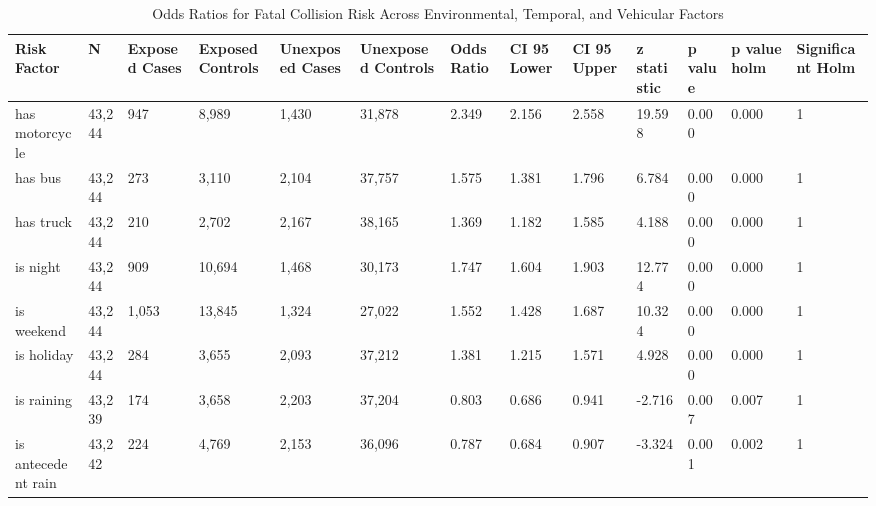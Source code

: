 \begin{table}[htbp]
\centering
\caption{Odds Ratios for Fatal Collision Risk Across Environmental, Temporal, and Vehicular Factors}
\label{tab:odds_ratios}
\begin{tabular}{lllllllllllll}
\toprule
\textbf{Risk Factor} & \textbf{N} & \textbf{Exposed Cases} & \textbf{Exposed Controls} & \textbf{Unexposed Cases} & \textbf{Unexposed Controls} & \textbf{Odds Ratio} & \textbf{CI 95 Lower} & \textbf{CI 95 Upper} & \textbf{z statistic} & \textbf{p value} & \textbf{p value holm} & \textbf{Significant Holm} \\
\midrule
has motorcycle & 43,244 & 947 & 8,989 & 1,430 & 31,878 & 2.349 & 2.156 & 2.558 & 19.598 & 0.000 & 0.000 & 1 \\
has bus & 43,244 & 273 & 3,110 & 2,104 & 37,757 & 1.575 & 1.381 & 1.796 & 6.784 & 0.000 & 0.000 & 1 \\
has truck & 43,244 & 210 & 2,702 & 2,167 & 38,165 & 1.369 & 1.182 & 1.585 & 4.188 & 0.000 & 0.000 & 1 \\
is night & 43,244 & 909 & 10,694 & 1,468 & 30,173 & 1.747 & 1.604 & 1.903 & 12.774 & 0.000 & 0.000 & 1 \\
is weekend & 43,244 & 1,053 & 13,845 & 1,324 & 27,022 & 1.552 & 1.428 & 1.687 & 10.324 & 0.000 & 0.000 & 1 \\
is holiday & 43,244 & 284 & 3,655 & 2,093 & 37,212 & 1.381 & 1.215 & 1.571 & 4.928 & 0.000 & 0.000 & 1 \\
is raining & 43,239 & 174 & 3,658 & 2,203 & 37,204 & 0.803 & 0.686 & 0.941 & -2.716 & 0.007 & 0.007 & 1 \\
is antecedent rain & 43,242 & 224 & 4,769 & 2,153 & 36,096 & 0.787 & 0.684 & 0.907 & -3.324 & 0.001 & 0.002 & 1 \\
\bottomrule
\end{tabular}
\end{table}